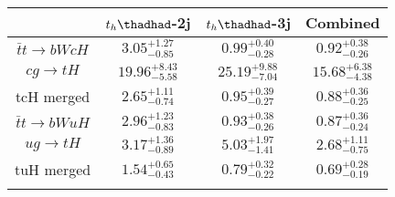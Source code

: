 \begin{tabular}{cccc} \toprule\toprule
 & $t_h\thadhad$-2j & $t_h\thadhad$-3j & Combined\\\midrule
$\bar{t}t\to bWcH$ & $3.05^{+1.27}_{-0.85}$ & $0.99^{+0.40}_{-0.28}$ & $0.92^{+0.38}_{-0.26}$\\
$cg\to tH$ & $19.96^{+8.43}_{-5.58}$ & $25.19^{+9.88}_{-7.04}$ & $15.68^{+6.38}_{-4.38}$\\
tcH merged & $2.65^{+1.11}_{-0.74}$ & $0.95^{+0.39}_{-0.27}$ & $0.88^{+0.36}_{-0.25}$\\
$\bar{t}t\to bWuH$ & $2.96^{+1.23}_{-0.83}$ & $0.93^{+0.38}_{-0.26}$ & $0.87^{+0.36}_{-0.24}$\\
$ug\to tH$ & $3.17^{+1.36}_{-0.89}$ & $5.03^{+1.97}_{-1.41}$ & $2.68^{+1.11}_{-0.75}$\\
tuH merged & $1.54^{+0.65}_{-0.43}$ & $0.79^{+0.32}_{-0.22}$ & $0.69^{+0.28}_{-0.19}$\\
\bottomrule\bottomrule\\
\end{tabular}
